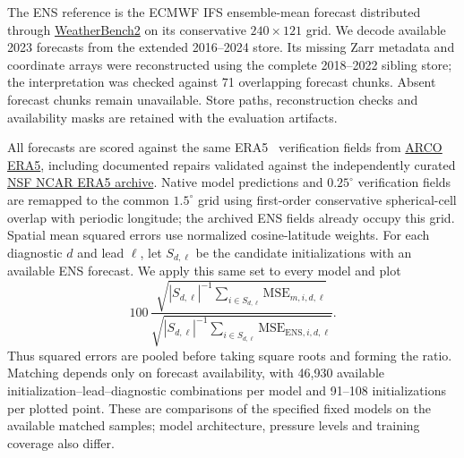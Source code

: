 The ENS reference is the ECMWF IFS ensemble-mean forecast distributed
through \href{https://weatherbench2.readthedocs.io/en/latest/data-guide.html}{WeatherBench2}
on its conservative $240\times121$ grid. We decode available 2023 forecasts
from the extended 2016--2024 store. Its missing Zarr metadata and coordinate
arrays were reconstructed using the complete 2018--2022 sibling store;
the interpretation was checked against 71 overlapping forecast chunks.
Absent forecast chunks remain unavailable. Store paths, reconstruction
checks and availability masks are retained with the evaluation artifacts.

All forecasts are scored against the same ERA5~\citep{hersbach2020era5}
verification fields from
\href{https://github.com/google-research/arco-era5}{ARCO ERA5}, including
documented repairs validated against the independently curated
\href{https://doi.org/10.5065/BH6N-5N20}{NSF NCAR ERA5 archive}.
Native model predictions and $0.25^\circ$ verification fields are remapped
to the common $1.5^\circ$ grid using first-order conservative spherical-cell
overlap with periodic longitude; the archived ENS fields already occupy
this grid. Spatial mean squared errors use normalized cosine-latitude
weights. For each diagnostic $d$ and lead $\ell$, let $S_{d,\ell}$ be the
candidate initializations with an available ENS forecast. We apply this
same set to every model and plot
\[
  100\,
  \frac{\sqrt{|S_{d,\ell}|^{-1}\sum_{i\in S_{d,\ell}}
                        \mathrm{MSE}_{m,i,d,\ell}}}
       {\sqrt{|S_{d,\ell}|^{-1}\sum_{i\in S_{d,\ell}}
                        \mathrm{MSE}_{\mathrm{ENS},i,d,\ell}}}.
\]
Thus squared errors are pooled before taking square roots and forming
the ratio. Matching depends only on forecast availability, with
46,930 available initialization--lead--diagnostic combinations per model
and 91--108 initializations per plotted point. These are comparisons
of the specified fixed models on the available matched samples; model
architecture, pressure levels and training coverage also differ.

